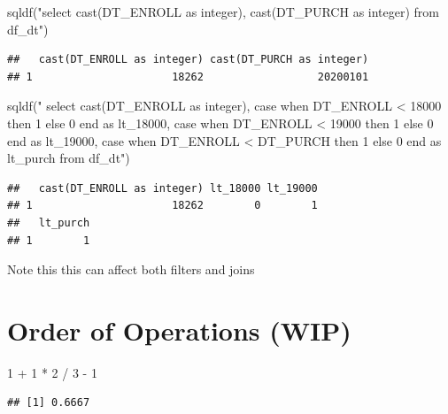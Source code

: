 \documentclass[
]{krantz}
\makeatletter
\newenvironment{Shaded}{\begin{snugshade}}{\end{snugshade}}
\newcommand{\DecValTok}[1]{\textcolor[rgb]{0.06,0.06,0.06}{#1}}
\newcommand{\FunctionTok}[1]{\textcolor[rgb]{0,0,0}{#1}}
\newcommand{\NormalTok}[1]{#1}
\newcommand{\SpecialCharTok}[1]{\textcolor[rgb]{0,0,0}{#1}}
\newcommand{\StringTok}[1]{\textcolor[rgb]{0.5,0.5,0.5}{#1}}
\newenvironment{kframe}{%
\medskip{}
\setlength{\fboxsep}{.8em}
 \def\at@end@of@kframe{}%
 \ifinner\ifhmode%
  \def\at@end@of@kframe{\end{minipage}}%
  \begin{minipage}{\columnwidth}%
 \fi\fi%
 \def\FrameCommand##1{\hskip\@totalleftmargin \hskip-\fboxsep
 \colorbox{shadecolor}{##1}\hskip-\fboxsep
     \hskip-\linewidth \hskip-\@totalleftmargin \hskip\columnwidth}%
 \MakeFramed {\advance\hsize-\width
   \@totalleftmargin\z@ \linewidth\hsize
   \@setminipage}}%
 {\par\unskip\endMakeFramed%
 \at@end@of@kframe}
\renewenvironment{Shaded}{\begin{kframe}}{\end{kframe}}
\makeatother
\begin{document}
\begin{Shaded}
\begin{Highlighting}[]
\FunctionTok{sqldf}\NormalTok{(}\StringTok{"select cast(DT\_ENROLL as integer), cast(DT\_PURCH as integer) from df\_dt"}\NormalTok{)}
\end{Highlighting}
\end{Shaded}

\begin{verbatim}
##   cast(DT_ENROLL as integer) cast(DT_PURCH as integer)
## 1                      18262                  20200101
\end{verbatim}

\begin{Shaded}
\begin{Highlighting}[]
\FunctionTok{sqldf}\NormalTok{(}\StringTok{"}
\StringTok{  select }
\StringTok{    cast(DT\_ENROLL as integer), }
\StringTok{    case when DT\_ENROLL \textless{} 18000 then 1 else 0 end as lt\_18000,}
\StringTok{    case when DT\_ENROLL \textless{} 19000 then 1 else 0 end as lt\_19000,}
\StringTok{    case when DT\_ENROLL \textless{} DT\_PURCH then 1 else 0 end as lt\_purch}
\StringTok{  from df\_dt"}\NormalTok{)}
\end{Highlighting}
\end{Shaded}

\begin{verbatim}
##   cast(DT_ENROLL as integer) lt_18000 lt_19000
## 1                      18262        0        1
##   lt_purch
## 1        1
\end{verbatim}

Note this this can affect both filters and joins

\hypertarget{order-of-operations-wip}{%
\section{Order of Operations (WIP)}\label{order-of-operations-wip}}

\begin{Shaded}
\begin{Highlighting}[]
\DecValTok{1} \SpecialCharTok{+} \DecValTok{1}  \SpecialCharTok{*} \DecValTok{2} \SpecialCharTok{/} \DecValTok{3} \SpecialCharTok{{-}} \DecValTok{1}
\end{Highlighting}
\end{Shaded}

\begin{verbatim}
## [1] 0.6667
\end{verbatim}
\end{document}
